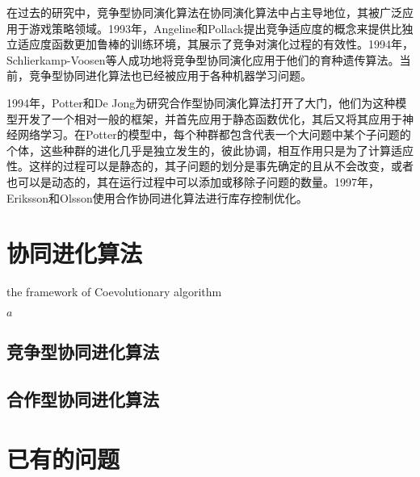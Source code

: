 \documentclass[a4paper]{article}
\begin{document}
    在过去的研究中，竞争型协同演化算法在协同演化算法中占主导地位，其被广泛应用于游戏策略领域\cite{rosin1995methods,pollack1998co}。1993年，Angeline和Pollack提出竞争适应度的概念来提供比独立适应度函数更加鲁棒的训练环境，其展示了竞争对演化过程的有效性。1994年，Schlierkamp-Voosen等人成功地将竞争型协同演化应用于他们的育种遗传算法。当前，竞争型协同进化算法也已经被应用于各种机器学习问题。
    
    1994年，Potter和De Jong为研究合作型协同演化算法打开了大门\cite{potter1994cooperative}，他们为这种模型开发了一个相对一般的框架，并首先应用于静态函数优化，其后又将其应用于神经网络学习。在Potter的模型中，每个种群都包含代表一个大问题中某个子问题的个体，这些种群的进化几乎是独立发生的，彼此协调，相互作用只是为了计算适应性。这样的过程可以是静态的，其子问题的划分是事先确定的且从不会改变，或者也可以是动态的，其在运行过程中可以添加或移除子问题的数量。1997年，Eriksson和Olsson使用合作协同进化算法进行库存控制优化。

    \newpage
    \section{协同进化算法}

    \begin{algorithm}
        
        \caption{the framework of Coevolutionary algorithm}
        \label{alg1}

        \begin{algorithmic}[1]
            \State $a$
        \end{algorithmic}

    \end{algorithm}


    \subsection{竞争型协同进化算法}

    \subsection{合作型协同进化算法}

    \newpage
    \section{已有的问题}

    \newpage
    
    
\end{document}
